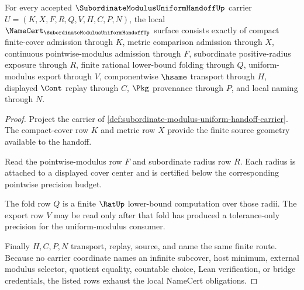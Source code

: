 \begin{theorem}
\label{thm:subordinate-modulus-uniform-handoff-namecert-obligations}
For every accepted $\SubordinateModulusUniformHandoffUp$ carrier $U=(K,X,F,R,Q,V,H,C,P,N)$, the local $\NameCert_{\SubordinateModulusUniformHandoffUp}$ surface consists exactly of compact finite-cover admission through $K$, metric comparison admission through $X$, continuous pointwise-modulus admission through $F$, subordinate positive-radius exposure through $R$, finite rational lower-bound folding through $Q$, uniform-modulus export through $V$, componentwise $\hsame$ transport through $H$, displayed $\Cont$ replay through $C$, $\Pkg$ provenance through $P$, and local naming through $N$.
\end{theorem}
\begin{proof}
Project the carrier of \autoref{def:subordinate-modulus-uniform-handoff-carrier}. The compact-cover row $K$ and metric row $X$ provide the finite source geometry available to the handoff.

Read the pointwise-modulus row $F$ and subordinate radius row $R$. Each radius is attached to a displayed cover center and is certified below the corresponding pointwise precision budget.

The fold row $Q$ is a finite $\RatUp$ lower-bound computation over those radii. The export row $V$ may be read only after that fold has produced a tolerance-only precision for the uniform-modulus consumer.

Finally $H,C,P,N$ transport, replay, source, and name the same finite route. Because no carrier coordinate names an infinite subcover, host minimum, external modulus selector, quotient equality, countable choice, Lean verification, or bridge credentials, the listed rows exhaust the local NameCert obligations.
\end{proof}

